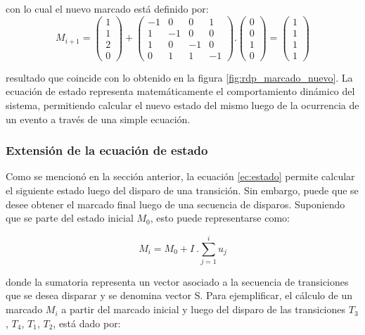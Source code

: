 \noindent con lo cual el nuevo marcado está definido por:
\begin{equation}
    M_{i+1} = 
    \begin{pmatrix}
        1 \\
        1 \\
        2 \\
        0
    \end{pmatrix}
    +
    \begin{pmatrix}
        -1 & 0 & 0 & 1 \\
        1 & -1 & 0 & 0 \\
        1 & 0 & -1 & 0 \\
        0 & 1 & 1 & -1 
    \end{pmatrix}
    .
    \begin{pmatrix}
        0 \\
        0 \\
        1 \\
        0
    \end{pmatrix}
    =
    \begin{pmatrix}
        1 \\
        1 \\
        1 \\
        1
    \end{pmatrix}    
\end{equation}

\noindent resultado que coincide con lo obtenido en la figura \ref{fig:rdp_marcado_nuevo}. La ecuación de estado representa matemáticamente el comportamiento dinámico del sistema, permitiendo calcular el nuevo estado del mismo luego de la ocurrencia de un evento a través de una simple ecuación.

\subsubsection{Extensión de la ecuación de estado}
Como se mencionó en la sección anterior, la ecuación \ref{ec:estado} permite calcular el siguiente estado luego del disparo de una transición. Sin embargo, puede que se desee obtener el marcado final luego de una secuencia de disparos. Suponiendo que se parte del estado inicial $M_0$, esto puede representarse como:

\begin{equation}
    M_i = M_0 + I \ . \sum_{j=1}^i u_j
\end{equation}

\noindent donde la sumatoria representa un vector asociado a la secuencia de transiciones que se desea disparar y se denomina vector S. Para ejemplificar, el cálculo de un marcado $M_i$ a partir del marcado inicial y luego del disparo de las transiciones {$T_3$, $T_4$, $T_1$, $T_2$,} está dado por:

